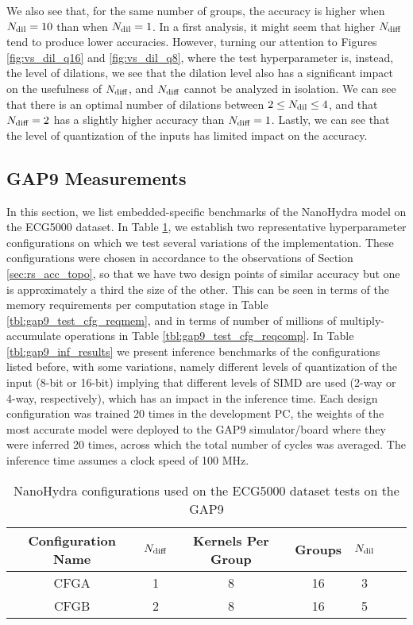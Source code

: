 We also see that, for the same number of groups, the accuracy is higher when $N\sb{\text{dil}} = 10$ than when $N\sb{\text{dil}} = 1$.
In a first analysis, it might seem that higher $N\sb{\text{diff}}$ tend to produce lower accuracies. 
However, turning our attention to Figures \ref{fig:vs_dil_q16} and \ref{fig:vs_dil_q8}, where the test hyperparameter is, instead, the level of dilations,
we see that the dilation level also has a significant impact on the usefulness of $N\sb{\text{diff}}$, and $N\sb{\text{diff}}$ cannot be analyzed in isolation.
We can see that there is an optimal number of dilations between $2 \leq N\sb{\text{dil}} \leq 4$, and that $N\sb{\text{diff}} = 2$ has a slightly higher accuracy than $N\sb{\text{diff}} = 1$.
Lastly, we can see that the level of quantization of the inputs has limited impact on the accuracy.

\subsection{GAP9 Measurements}\label{sec:rs_gap9_meas}
In this section, we list embedded-specific benchmarks of the NanoHydra model on the ECG5000 dataset. 
In Table \ref{tbl:gap9_test_cfg}, we establish two representative hyperparameter configurations on which we test several variations of the implementation.
These configurations were chosen in accordance to the observations of Section \ref{sec:rs_acc_topo}, so that we have two design points of similar accuracy but one is approximately
a third the size of the other. This can be seen in terms of the memory requirements per computation stage in Table \ref{tbl:gap9_test_cfg_reqmem}, and in terms of number of millions of
multiply-accumulate operations in Table \ref{tbl:gap9_test_cfg_reqcomp}. In Table \ref{tbl:gap9_inf_results} we present inference benchmarks of the configurations listed before, with some
variations, namely different levels of quantization of the input (8-bit or 16-bit) implying that different levels of SIMD are used (2-way or 4-way, respectively), which has an impact
in the inference time. Each design configuration was trained 20 times in the development PC, the weights of the most accurate model were deployed to the GAP9 simulator/board where they were inferred 20 times,
across which the total number of cycles was averaged. The inference time assumes a clock speed of 100 MHz.

\begin{table}[p!]
    \centerfloat
    \begin{tabular}{ c c c c c c c }
    \toprule
    \textbf{Configuration Name} & $N\sb{\text{diff}}$ & \textbf{Kernels Per Group} & \textbf{Groups} & $N\sb{\text{dil}}$ \\
    \midrule
    CFGA & 1 & 8 & 16 & 3 \\
    CFGB & 2 & 8 & 16 & 5 \\
    \bottomrule
    \end{tabular}
    \caption{NanoHydra configurations used on the ECG5000 dataset tests on the GAP9}%
    \label{tbl:gap9_test_cfg}
\end{table}

